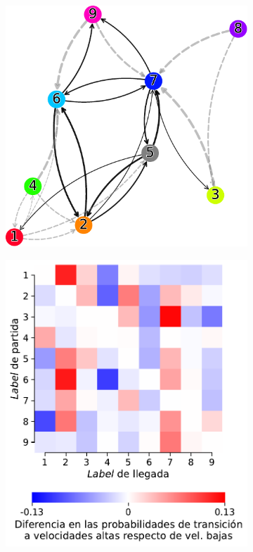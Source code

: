 \begin{figure}[!htbp]
    \centering
    \begin{subfigure}{.45\textwidth}
        \includegraphics[width=1\textwidth]{figuras/expertos/labels/transition_graph.pdf}
        \caption{}
    \end{subfigure}
    \hspace{\fill}
    \begin{subfigure}{.45\textwidth}
        \includegraphics[width=1\textwidth]{figuras/expertos/labels/trans_prob_change.pdf}

\end{subfigure}
\end{figure}
